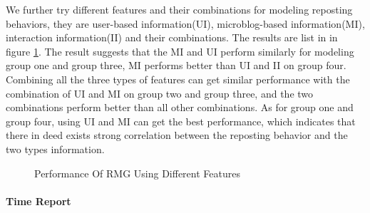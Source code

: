 We further try different features and their combinations for modeling reposting behaviors, they are user-based information(UI), microblog-based information(MI), interaction information(II) and their combinations. The results are list in in figure \ref{fig:performances}. The result suggests that the MI and UI perform similarly for modeling group one and group three, MI performs better than UI and II on group four. Combining all the three types of features can get similar performance with the combination of UI and MI on group two and group three, and the two combinations perform better than all other combinations. As for group one and group four, using UI and MI can get the best performance, which indicates that there in deed exists strong correlation between the reposting behavior and the two types information.

 \begin{figure}
  \centering
  \hspace{1in}
  \hspace{1in}
  \caption{Performance Of RMG Using Different Features}
  \label{fig:performances} %
\end{figure}

\paragraph{Time Report}
